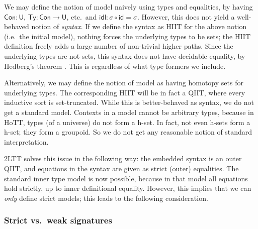 \documentclass[12pt,a4paper,twoside,openany]{book}
\theoremstyle{remark}
\theoremstyle{definition}
\theoremstyle{theorem}
\newcommand{\ms}[1]{\mathsf{#1}}
\newcommand{\id}{\mathsf{id}}
\newcommand{\Con}{\mathsf{Con}}
\newcommand{\Ty}{\mathsf{Ty}}
\newcommand{\U}{\mathsf{U}}
\begin{document}
We may define the notion of model naively using types and equalities, by having
$\Con : \U$, $\Ty : \Con \to \U$, etc.\ and $\ms{idl} : \sigma \circ \id =
\sigma$. However, this does not yield a well-behaved notion of \emph{syntax}. If
we define the syntax as HIIT for the above notion (i.e.\ the initial model),
nothing forces the underlying types to be sets; the HIIT definition freely adds
a large number of non-trivial higher paths. Since the underlying types are not
sets, this syntax does not have decidable equality, by Hedberg's theorem
\cite{hedberg}. This is regardless of what type formers we include.

Alternatively, we may define the notion of model as having homotopy sets for
underlying types. The corresponding HIIT will be in fact a QIIT, where every
inductive sort is set-truncated. While this is better-behaved as syntax, we do
not get a standard model. Contexts in a model cannot be arbitrary types, because
in HoTT, types (of a universe) do not form a h-set. In fact, not even h-sets form
a h-set; they form a groupoid. So we do not get any reasonable notion of standard
interpretation.

2LTT solves this issue in the following way: the embedded syntax is an outer
QIIT, and equations in the syntax are given as strict (outer) equalities. The
standard inner type model is now possible, because in that model all equations
hold strictly, up to inner definitional equality. However, this implies that we
can \emph{only} define strict models; this leads to the following consideration.

\subsubsection{Strict vs.\ weak signatures}
\end{document}
